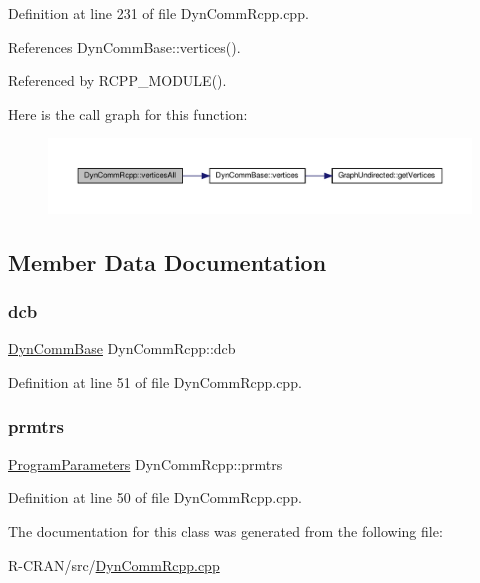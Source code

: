 Definition at line 231 of file Dyn\+Comm\+Rcpp.\+cpp.



References Dyn\+Comm\+Base\+::vertices().



Referenced by R\+C\+P\+P\+\_\+\+M\+O\+D\+U\+L\+E().

Here is the call graph for this function\+:
\nopagebreak
\begin{figure}[H]
\begin{center}
\leavevmode
\includegraphics[width=350pt]{classDynCommRcpp_aa2aa3fe8c7af4239bd9b3c6a669329ec_cgraph}
\end{center}
\end{figure}


\subsection{Member Data Documentation}
\mbox{\label{classDynCommRcpp_a29aa77f1324fd9891a67feedea880961}} 
\subsubsection{\texorpdfstring{dcb}{dcb}}
{\footnotesize\ttfamily \hyperlink{classDynCommBase}{Dyn\+Comm\+Base} Dyn\+Comm\+Rcpp\+::dcb\hspace{0.3cm}{\ttfamily [private]}}



Definition at line 51 of file Dyn\+Comm\+Rcpp.\+cpp.

\mbox{\label{classDynCommRcpp_a686a84dced9c0cd812cb184d48958758}} 
\subsubsection{\texorpdfstring{prmtrs}{prmtrs}}
{\footnotesize\ttfamily \hyperlink{structProgramParameters}{Program\+Parameters} Dyn\+Comm\+Rcpp\+::prmtrs\hspace{0.3cm}{\ttfamily [private]}}



Definition at line 50 of file Dyn\+Comm\+Rcpp.\+cpp.



The documentation for this class was generated from the following file\+:\begin{DoxyCompactItemize}
\item 
R-\/\+C\+R\+A\+N/src/\hyperlink{DynCommRcpp_8cpp}{Dyn\+Comm\+Rcpp.\+cpp}\end{DoxyCompactItemize}
